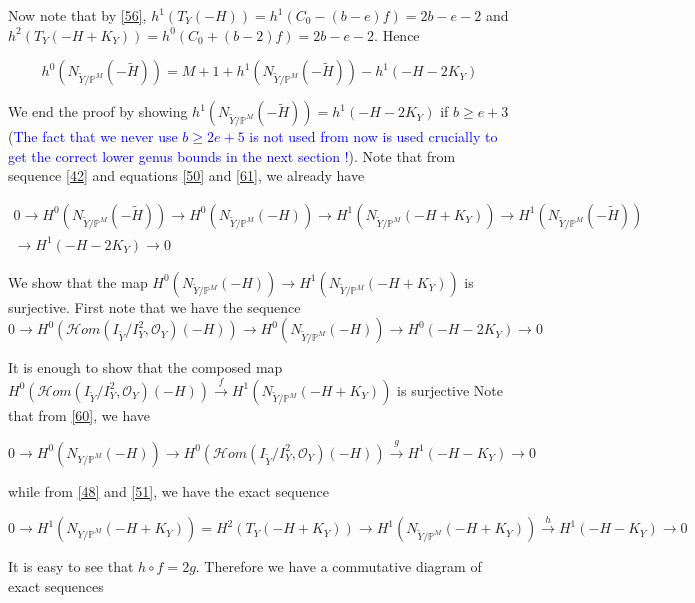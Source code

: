 \documentclass[11pt,twoside]{amsart}
\theoremstyle{plain}
\numberwithin{equation}{section}
\theoremstyle{definition}
\begin{document}
Now note that by \ref{56}, $h^1(T_Y(-H)) = h^1(C_0-(b-e)f) = 2b-e-2$ and $h^2(T_Y(-H+K_Y)) = h^0(C_0+(b-2)f) = 2b-e-2$. Hence 

\begin{equation}\label{63}
   h^0(N_{\widetilde{Y}/\mathbb{P}^M}(-\widetilde{H})) = M+1 + h^1(N_{\widetilde{Y}/\mathbb{P}^M}(-\widetilde{H}))-h^1(-H-2K_Y) 
\end{equation}

We end the proof by showing $h^1(N_{\widetilde{Y}/\mathbb{P}^M}(-\widetilde{H}))=h^1(-H-2K_Y)$ if $b \geq e+3$ (\textcolor{blue}{The fact that we never use $b \geq 2e+5$ is not used from now is used crucially to get the correct lower genus bounds in the next section !}). Note that from sequence \ref{42} and equations \ref{50} and \ref{61}, we already have

\begin{multline}\label{64}
0 \to H^0(N_{\widetilde{Y}/\mathbb{P}^M}(-\widetilde{H})) \to H^0(N_{\widetilde{Y}/\mathbb{P}^M}(-H))  \xrightarrow[]{} H^1(N_{\widetilde{Y}/\mathbb{P}^M} (-H+K_Y)) \to H^1(N_{\widetilde{Y}/\mathbb{P}^M}(-\widetilde{H})) 
 \\ \to H^1(-H-2K_Y) \to 0  
\end{multline}

We show that the map $H^0(N_{\widetilde{Y}/\mathbb{P}^M}(-H))  \xrightarrow[]{} H^1(N_{\widetilde{Y}/\mathbb{P}^M} (-H+K_Y))$ is surjective. First note that we have the sequence 
$$0 \to H^0(\mathcal{H}om(I_{\widetilde{Y}}/I_{Y}^2, \mathcal{O}_Y)(-H)) \to H^0(N_{\widetilde{Y}/\mathbb{P}^M}(-H)) \to H^0(-H-2K_Y) \to 0$$

It is enough to show that the composed map $H^0(\mathcal{H}om(I_{\widetilde{Y}}/I_{Y}^2, \mathcal{O}_Y)(-H))  \xrightarrow[]{f} H^1(N_{\widetilde{Y}/\mathbb{P}^M} (-H+K_Y))$ is surjective
Note that from 
\ref{60}, we have 

$$0 \to H^0(N_{Y/\mathbb{P}^M}(-H)) \to  H^0(\mathcal{H}om(I_{\widetilde{Y}}/I_{Y}^2, \mathcal{O}_Y)(-H)) \xrightarrow[]{g} H^1(-H-K_Y) \to 0$$

while from \ref{48} and \ref{51}, we have the exact sequence 

$$ 0 \to H^1(N_{Y/\mathbb{P}^M}(-H+K_Y)) = H^2(T_Y(-H+K_Y)) \to  H^1(N_{\widetilde{Y}/\mathbb{P}^M}(-H+K_Y)) \xrightarrow[]{h} H^1(-H-K_Y) \to 0  $$

It is easy to see that $h \circ f = 2g$. 
Therefore we have a commutative diagram of exact sequences
\end{document}
